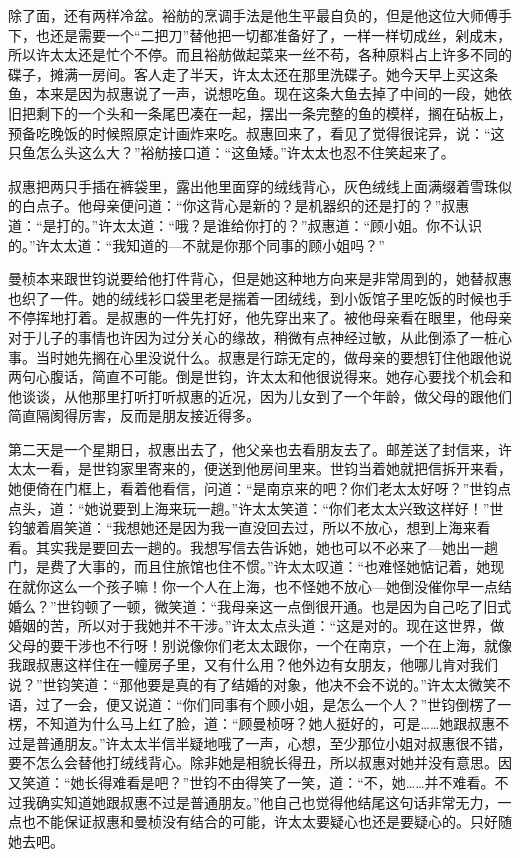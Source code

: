 \par 除了面，还有两样冷盆。裕舫的烹调手法是他生平最自负的，但是他这位大师傅手下，也还是需要一个“二把刀”替他把一切都准备好了，一样一样切成丝，剁成末，所以许太太还是忙个不停。而且裕舫做起菜来一丝不苟，各种原料占上许多不同的碟子，摊满一房间。客人走了半天，许太太还在那里洗碟子。她今天早上买这条鱼，本来是因为叔惠说了一声，说想吃鱼。现在这条大鱼去掉了中间的一段，她依旧把剩下的一个头和一条尾巴凑在一起，摆出一条完整的鱼的模样，搁在砧板上，预备吃晚饭的时候照原定计画炸来吃。叔惠回来了，看见了觉得很诧异，说：“这只鱼怎么头这么大？”裕舫接口道：“这鱼矮。”许太太也忍不住笑起来了。
\par 叔惠把两只手插在裤袋里，露出他里面穿的绒线背心，灰色绒线上面满缀着雪珠似的白点子。他母亲便问道：“你这背心是新的？是机器织的还是打的？”叔惠道：“是打的。”许太太道：“哦？是谁给你打的？”叔惠道：“顾小姐。你不认识的。”许太太道：“我知道的—不就是你那个同事的顾小姐吗？”
\par 曼桢本来跟世钧说要给他打件背心，但是她这种地方向来是非常周到的，她替叔惠也织了一件。她的绒线衫口袋里老是揣着一团绒线，到小饭馆子里吃饭的时候也手不停挥地打着。是叔惠的一件先打好，他先穿出来了。被他母亲看在眼里，他母亲对于儿子的事情也许因为过分关心的缘故，稍微有点神经过敏，从此倒添了一桩心事。当时她先搁在心里没说什么。叔惠是行踪无定的，做母亲的要想钉住他跟他说两句心腹话，简直不可能。倒是世钧，许太太和他很说得来。她存心要找个机会和他谈谈，从他那里打听打听叔惠的近况，因为儿女到了一个年龄，做父母的跟他们简直隔阂得厉害，反而是朋友接近得多。
\par 第二天是一个星期日，叔惠出去了，他父亲也去看朋友去了。邮差送了封信来，许太太一看，是世钧家里寄来的，便送到他房间里来。世钧当着她就把信拆开来看，她便倚在门框上，看着他看信，问道：“是南京来的吧？你们老太太好呀？”世钧点点头，道：“她说要到上海来玩一趟。”许太太笑道：“你们老太太兴致这样好！”世钧皱着眉笑道：“我想她还是因为我一直没回去过，所以不放心，想到上海来看看。其实我是要回去一趟的。我想写信去告诉她，她也可以不必来了—她出一趟门，是费了大事的，而且住旅馆也住不惯。”许太太叹道：“也难怪她惦记着，她现在就你这么一个孩子嘛！你一个人在上海，也不怪她不放心—她倒没催你早一点结婚么？”世钧顿了一顿，微笑道：“我母亲这一点倒很开通。也是因为自己吃了旧式婚姻的苦，所以对于我她并不干涉。”许太太点头道：“这是对的。现在这世界，做父母的要干涉也不行呀！别说像你们老太太跟你，一个在南京，一个在上海，就像我跟叔惠这样住在一幢房子里，又有什么用？他外边有女朋友，他哪儿肯对我们说？”世钧笑道：“那他要是真的有了结婚的对象，他决不会不说的。”许太太微笑不语，过了一会，便又说道：“你们同事有个顾小姐，是怎么一个人？”世钧倒楞了一楞，不知道为什么马上红了脸，道：“顾曼桢呀？她人挺好的，可是……她跟叔惠不过是普通朋友。”许太太半信半疑地哦了一声，心想，至少那位小姐对叔惠很不错，要不怎么会替他打绒线背心。除非她是相貌长得丑，所以叔惠对她并没有意思。因又笑道：“她长得难看是吧？”世钧不由得笑了一笑，道：“不，她……并不难看。不过我确实知道她跟叔惠不过是普通朋友。”他自己也觉得他结尾这句话非常无力，一点也不能保证叔惠和曼桢没有结合的可能，许太太要疑心也还是要疑心的。只好随她去吧。
